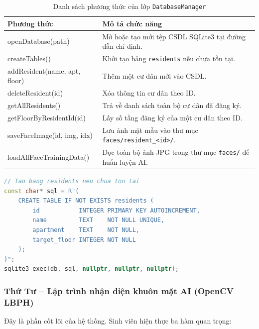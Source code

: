 \documentclass[12pt,a4paper]{article}
\begin{document}
\begin{table}[H]
    \centering
    \renewcommand{\arraystretch}{1.4}
    \begin{tabular}{|>{\ttfamily}p{5.5cm}|p{9cm}|}
        \hline
        \rowcolor{lightblue}
        \textbf{Phương thức} & \textbf{Mô tả chức năng} \\
        \hline
        openDatabase(path) & Mở hoặc tạo mới tệp CSDL SQLite3 tại đường dẫn chỉ định. \\
        \hline
        createTables() & Khởi tạo bảng \texttt{residents} nếu chưa tồn tại. \\
        \hline
        addResident(name, apt, floor) & Thêm một cư dân mới vào CSDL. \\
        \hline
        deleteResident(id) & Xóa thông tin cư dân theo ID. \\
        \hline
        getAllResidents() & Trả về danh sách toàn bộ cư dân đã đăng ký. \\
        \hline
        getFloorByResidentId(id) & Lấy số tầng đăng ký của một cư dân theo ID. \\
        \hline
        saveFaceImage(id, img, idx) & Lưu ảnh mặt mẫu vào thư mục \texttt{faces/resident\_<id>/}. \\
        \hline
        loadAllFaceTrainingData() & Đọc toàn bộ ảnh JPG trong thư mục \texttt{faces/} để huấn luyện AI. \\
        \hline
    \end{tabular}
    \caption{Danh sách phương thức của lớp \texttt{DatabaseManager}}
\end{table}

\begin{lstlisting}[language=C++, caption={Khởi tạo cấu trúc bảng cư dân trong SQLite3}]
// Tao bang residents neu chua ton tai
const char* sql = R"(
    CREATE TABLE IF NOT EXISTS residents (
        id           INTEGER PRIMARY KEY AUTOINCREMENT,
        name         TEXT    NOT NULL UNIQUE,
        apartment    TEXT    NOT NULL,
        target_floor INTEGER NOT NULL
    );
)";
sqlite3_exec(db, sql, nullptr, nullptr, nullptr);
\end{lstlisting}

\subsubsection{Thứ Tư -- Lập trình nhận diện khuôn mặt AI (OpenCV LBPH)}

Đây là phần cốt lõi của hệ thống. Sinh viên hiện thực ba hàm quan trọng:
\end{document}
